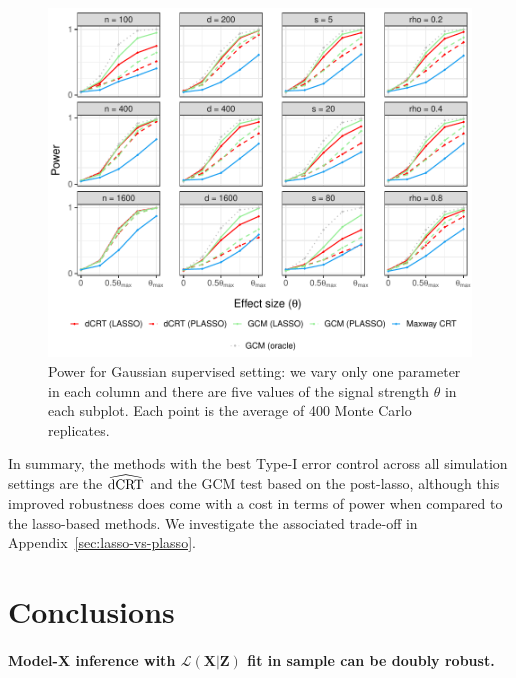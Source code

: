 \documentclass[12pt]{article}
\theoremstyle{definition}
\theoremstyle{remark}
\newcommand{\prx}{\bm X}								%
\newcommand{\prz}{\bm Z}								%
\newcommand{\law}{\mathcal L}							%
\newcommand{\dCRThat}{\widehat{\textnormal{dCRT}}}		%
\begin{document}
	\begin{figure}[h]
		\centering
		\includegraphics[scale = 1]{figures/gaussian_supervised_setting_alternative_partial.pdf}
		\caption{Power for Gaussian supervised setting: we vary only one parameter in each column and there are five values of the signal strength $\theta$ in each subplot. Each point is the average of 400 Monte Carlo replicates.}
		\label{fig:gaussian_supervised_partial_alternative}
\end{figure}

In summary, the methods with the best Type-I error control across all simulation settings are the $\dCRThat$ and the GCM test based on the post-lasso, although this improved robustness does come with a cost in terms of power when compared to the lasso-based methods. We investigate the associated trade-off in Appendix~\ref{sec:lasso-vs-plasso}.

\section{Conclusions} \label{sec:conclusion}

\paragraph{Model-X inference with $\law(\prx|\prz)$ fit in sample can be doubly robust.}
\end{document}
